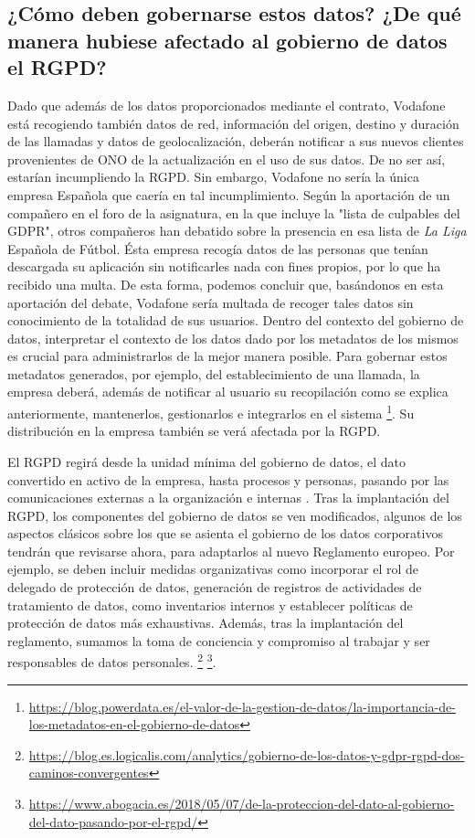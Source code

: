 \documentclass{article}
\begin{document}
\subsection{¿Cómo deben gobernarse estos datos? ¿De qué manera hubiese afectado al gobierno de datos el RGPD?}
\label{2.1}
Dado que además de los datos proporcionados mediante el contrato, Vodafone está recogiendo también datos de red, información del origen, destino y duración de las llamadas y datos de geolocalización, deberán notificar a sus nuevos clientes provenientes de ONO de la actualización en el uso de sus datos. De no ser así, estarían incumpliendo la RGPD. Sin embargo, Vodafone no sería la única empresa Española que caería en tal incumplimiento. Según la aportación de un compañero en el foro de la asignatura, en la que incluye la "lista de culpables del GDPR", otros compañeros han debatido sobre la presencia en esa lista de \textit{La Liga} Española de Fútbol. Ésta empresa recogía datos de las personas que tenían descargada su aplicación sin notificarles nada con fines propios, por lo que ha recibido una multa. De esta forma, podemos concluir que, basándonos en esta aportación del debate, Vodafone sería multada de recoger tales datos sin conocimiento de la totalidad de sus usuarios.
Dentro del contexto del gobierno de datos, interpretar el contexto de los datos dado por los metadatos de los mismos es crucial para administrarlos de la mejor manera posible. Para gobernar estos metadatos generados, por ejemplo, del establecimiento de una llamada, la empresa deberá, además de notificar al usuario su recopilación como se explica anteriormente, mantenerlos, gestionarlos e integrarlos en el sistema \footnote{\url{https://blog.powerdata.es/el-valor-de-la-gestion-de-datos/la-importancia-de-los-metadatos-en-el-gobierno-de-datos}}. Su distribución en la empresa también se verá afectada por la RGPD. 

El RGPD regirá desde la unidad mínima del gobierno de datos, el dato convertido en activo de la empresa, hasta procesos y personas, pasando por las comunicaciones externas a la organización e internas .
Tras la implantación del RGPD, los componentes del gobierno de datos se ven modificados, algunos de los aspectos clásicos sobre los que se asienta el gobierno de los datos corporativos tendrán que revisarse ahora, para adaptarlos al nuevo Reglamento europeo. Por ejemplo, se deben incluir medidas organizativas como incorporar el rol de delegado de protección de datos, generación de registros de actividades de tratamiento de datos, como inventarios internos y establecer políticas de protección de datos más exhaustivas. Además, tras la implantación del reglamento, sumamos la toma de conciencia y compromiso al trabajar y ser responsables de datos personales.
\footnote{\url{https://blog.es.logicalis.com/analytics/gobierno-de-los-datos-y-gdpr-rgpd-dos-caminos-convergentes}} \footnote{\url{https://www.abogacia.es/2018/05/07/de-la-proteccion-del-dato-al-gobierno-del-dato-pasando-por-el-rgpd/}}.
\end{document}
